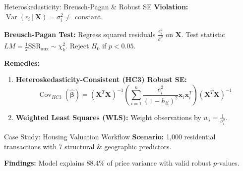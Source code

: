 \documentclass[aspectratio=169,ignorenonframetext]{beamer}
\begin{document}
\begin{frame}{Heteroskedasticity: Breusch-Pagan \& Robust SE}
\textbf{Violation:}
\(\operatorname{Var}(\epsilon_{i}~|~\mathbf{X}) = \sigma_{i}^{2} \neq \text{ constant}\).

\textbf{Breusch-Pagan Test:} Regress squared residuals
\(\frac{e_{i}^{2}}{{\hat{\sigma}}^{2}}\) on \(\mathbf{X}\). Test
statistic \(LM = \frac{1}{2}\text{SSR}_{\text{aux}} \sim \chi_{k}^{2}\).
Reject \(H_{0}\) if \(p < 0.05\).

\textbf{Remedies:}

\begin{enumerate}
\item
  \textbf{Heteroskedasticity-Consistent (HC3) Robust SE:}
  \[\operatorname{Cov}_{HC3}\left( \hat{\mathbf{\beta}} \right) = \left( \mathbf{X}^{T}\mathbf{X} \right)^{- 1}\left( \sum_{i = 1}^{n}\frac{e_{i}^{2}}{\left( 1 - h_{ii} \right)^{2}}\mathbf{x}_{i}\mathbf{x}_{i}^{T} \right)\left( \mathbf{X}^{T}\mathbf{X} \right)^{- 1}\]
\item
  \textbf{Weighted Least Squares (WLS):} Weight observations by
  \(w_{i} = \frac{1}{\sigma_{i}^{2}}\).
\end{enumerate}
\end{frame}

\begin{frame}[fragile]{Case Study: Housing Valuation Workflow}
\textbf{Scenario:} 1,000 residential transactions with 7 structural \&
geographic predictors.

\begin{Shaded}
\begin{Highlighting}[]

\OperatorTok{=}  \OperatorTok{\textbackslash{}}

\OperatorTok{=}\OperatorTok{=}
\OperatorTok{=}\OperatorTok{=}\NormalTok{)}
\end{Highlighting}
\end{Shaded}

\textbf{Findings:} Model explains \(88.4\%\) of price variance with
valid robust \(p\)-values.
\end{frame}
\end{document}
